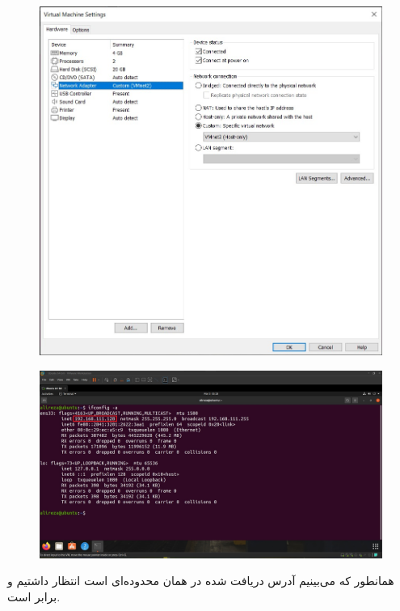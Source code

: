 \documentclass{article}
\begin{document}
\begin{figure}[H]
    \centering
    \includegraphics[width=1.0\textwidth]{figures/8b.jpg}
    \caption
	{
	}
    \label{fig:fig1}
\end{figure}

\begin{figure}[H]
    \centering
    \includegraphics[width=1.0\textwidth]{figures/8c.jpg}
    \caption
	{
	}
    \label{fig:fig1}
\end{figure}
همانطور که می‌بینیم آدرس دریافت شده در همان محدوده‌ای است انتظار داشتیم و برابر  است.
\end{document}
